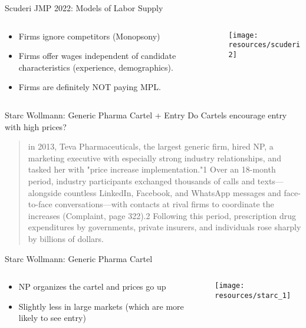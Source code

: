 \begin{frame}{Scuderi JMP 2022: Models of Labor Supply}
\begin{columns}
\begin{column}{0.5\textwidth}
\begin{itemize}
\item Firms ignore competitors (Monopsony)
\item Firms offer wages independent of candidate characteristics (experience, demographics).
\item Firms are definitely NOT paying MPL.
\end{itemize}
\end{column}
\begin{column}{0.5\textwidth}
\texttt{[image: resources/scuderi2]}
\end{column}
\end{columns}
\end{frame}

\begin{frame}{Starc Wollmann: Generic Pharma Cartel + Entry}
Do Cartels encourage entry with high prices?\\
\vspace{0.25cm}
\begin{quote}
in 2013, Teva Pharmaceuticals, the largest generic firm, hired NP, a marketing executive with especially strong industry relationships, and tasked her with "price increase implementation."1 Over an 18-month period, industry participants exchanged thousands of calls and texts—alongside countless LinkedIn, Facebook, and WhatsApp messages and face-to-face conversations—with contacts at rival firms to coordinate the increases (Complaint, page 322).2 Following this period, prescription drug expenditures by governments, private insurers, and individuals rose sharply by billions of dollars.
\end{quote}
\end{frame}



\begin{frame}{Starc Wollmann: Generic Pharma Cartel }
\begin{columns}
\begin{column}{0.5\textwidth}
\begin{itemize}
\item NP organizes the cartel and prices go up
\item Slightly less in large markets (which are more likely to see entry)
\end{itemize}
\end{column}
\begin{column}{0.5\textwidth}
\texttt{[image: resources/starc\_1]}
\end{column}
\end{columns}
\end{frame}



